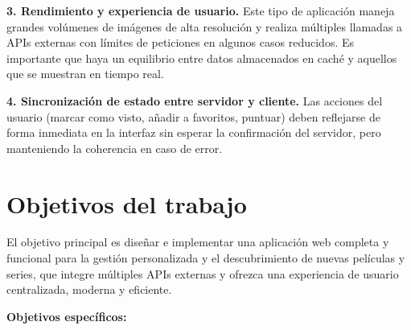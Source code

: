\textbf{3. Rendimiento y experiencia de usuario.} Este tipo de aplicación maneja grandes volúmenes de imágenes de alta resolución y realiza múltiples llamadas a APIs externas con límites de peticiones en algunos casos reducidos. Es importante que haya un equilibrio entre datos almacenados en caché y aquellos que se muestran en tiempo real.

\textbf{4. Sincronización de estado entre servidor y cliente.} Las acciones del usuario (marcar como visto, añadir a favoritos, puntuar) deben reflejarse de forma inmediata en la interfaz sin esperar la confirmación del servidor, pero manteniendo la coherencia en caso de error.

\section{Objetivos del trabajo}

El objetivo principal es diseñar e implementar una aplicación web completa y funcional para la gestión personalizada y el descubrimiento de nuevas películas y series, que integre múltiples APIs externas y ofrezca una experiencia de usuario centralizada, moderna y eficiente.

\textbf{Objetivos específicos:}

